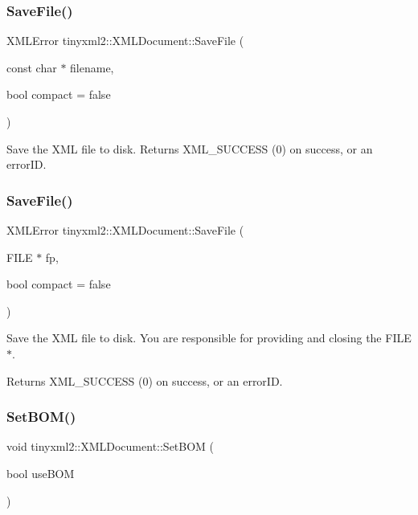 \subsubsection{\texorpdfstring{Save\+File()}{SaveFile()}\hspace{0.1cm}{\footnotesize\ttfamily [1/2]}}
{\footnotesize\ttfamily X\+M\+L\+Error tinyxml2\+::\+X\+M\+L\+Document\+::\+Save\+File (\begin{DoxyParamCaption}\item[{const char $\ast$}]{filename,  }\item[{bool}]{compact = {\ttfamily false} }\end{DoxyParamCaption})}

Save the X\+ML file to disk. Returns X\+M\+L\+\_\+\+S\+U\+C\+C\+E\+SS (0) on success, or an error\+ID. \mbox{\label{classtinyxml2_1_1_x_m_l_document_a8b95779479a0035acc67b3a61dfe1b74}} 
\subsubsection{\texorpdfstring{Save\+File()}{SaveFile()}\hspace{0.1cm}{\footnotesize\ttfamily [2/2]}}
{\footnotesize\ttfamily X\+M\+L\+Error tinyxml2\+::\+X\+M\+L\+Document\+::\+Save\+File (\begin{DoxyParamCaption}\item[{F\+I\+LE $\ast$}]{fp,  }\item[{bool}]{compact = {\ttfamily false} }\end{DoxyParamCaption})}

Save the X\+ML file to disk. You are responsible for providing and closing the F\+I\+L\+E$\ast$.

Returns X\+M\+L\+\_\+\+S\+U\+C\+C\+E\+SS (0) on success, or an error\+ID. \mbox{\label{classtinyxml2_1_1_x_m_l_document_a14419b698f7c4b140df4e80f3f0c93b0}} 
\subsubsection{\texorpdfstring{Set\+B\+O\+M()}{SetBOM()}}
{\footnotesize\ttfamily void tinyxml2\+::\+X\+M\+L\+Document\+::\+Set\+B\+OM (\begin{DoxyParamCaption}\item[{bool}]{use\+B\+OM }\end{DoxyParamCaption})\hspace{0.3cm}{\ttfamily [inline]}}

